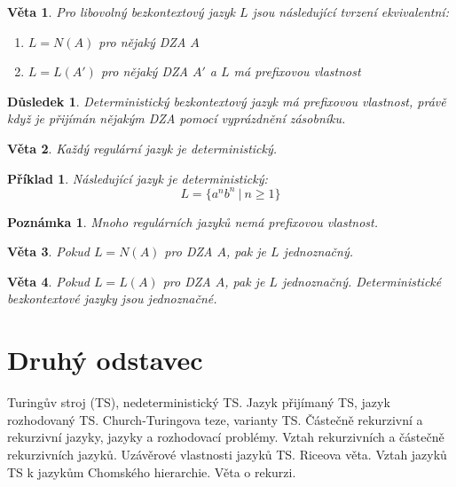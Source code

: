 \documentclass[10pt,a4paper]{article}
\theoremstyle{note}
\newtheorem{veta}{Věta}
\newtheorem{priklad}{Příklad}
\newtheorem{poznamka}{Poznámka}
\newtheorem{dusledek}{Důsledek}
\begin{document}
\begin{veta}
Pro libovolný bezkontextový jazyk $L$ jsou následující tvrzení ekvivalentní:
\begin{enumerate}
\item
$L = N(A)$ pro nějaký DZA $A$
\item
$L = L(A')$ pro nějaký DZA $A'$ a $L$ má prefixovou vlastnost
\end{enumerate}
\end{veta}



\begin{dusledek}
Deterministický bezkontextový jazyk má prefixovou vlastnost, právě když je přijímán nějakým DZA pomocí vyprázdnění zásobníku.
\end{dusledek}

\begin{veta}
Každý regulární jazyk je deterministický.
\end{veta}


\begin{priklad}
Následující jazyk je deterministický:
$$
L = \lbrace a^nb^n\ |\ n\ge1 \rbrace
$$
\end{priklad}

\begin{poznamka}
Mnoho regulárních jazyků \textit{nemá} prefixovou vlastnost.
\end{poznamka}

\begin{veta}
Pokud $L=N(A)$ pro DZA $A$, pak je $L$ jednoznačný.
\end{veta}



\begin{veta}
Pokud $L=L(A)$ pro DZA $A$, pak je $L$ jednoznačný. Deterministické bezkontextové jazyky jsou jednoznačné.
\end{veta}



\section{Druhý odstavec}

Turingův stroj (TS), nedeterministický TS. Jazyk přijímaný TS, jazyk rozhodovaný TS. Church-Turingova
teze, varianty TS. Částečně rekurzivní a rekurzivní jazyky, jazyky a rozhodovací problémy. Vztah rekurzivních
a částečně rekurzivních jazyků. Uzávěrové vlastnosti jazyků TS. Riceova věta. Vztah jazyků TS k jazykům
Chomského hierarchie. Věta o rekurzi.
\end{document}
